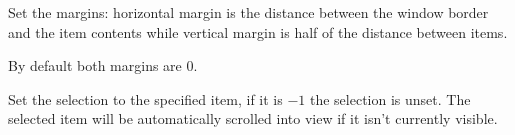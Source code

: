 
Set the margins: horizontal margin is the distance between the window
border and the item contents while vertical margin is half of the
distance between items.

By default both margins are $0$.


\label{wxvlistboxsetselection}


Set the selection to the specified item, if it is $-1$ the selection is
unset. The selected item will be automatically scrolled into view if it isn't
currently visible.

